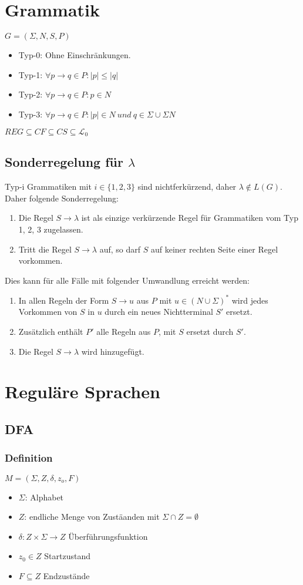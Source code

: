 \documentclass[9pt]{article}
\begin{document}
\section{Grammatik}
$G = (\Sigma, N, S, P)$
\begin{itemize}
	\item Typ-0: Ohne Einschränkungen.
	\item Typ-1: $\forall p \rightarrow q \in P : |p| \leq |q|$ 
	\item Typ-2: $\forall p \rightarrow q \in P : p \in N$ 
	\item Typ-3: $\forall p \rightarrow q \in P : |p| \in N \ und\ q \in \Sigma \cup \Sigma N$ 
\end{itemize}
$REG \subseteq CF \subseteq CS \subseteq \mathcal{L}_0$
\subsection{Sonderregelung für $\lambda$}
Typ-i Grammatiken mit $i\in \{1, 2, 3\}$ sind nichtferkürzend, daher $\lambda \notin L(G)$. Daher folgende Sonderregelung:
\begin{enumerate}
	\item Die Regel $S \rightarrow \lambda$ ist als einzige verkürzende Regel für Grammatiken vom Typ 1, 2, 3 zugelassen.
	\item Tritt die Regel $S \rightarrow \lambda$ auf, so darf $S$ auf keiner rechten Seite einer Regel vorkommen.
\end{enumerate}
Dies kann für alle Fälle mit folgender Umwandlung erreicht werden:
\begin{enumerate}
	\item In allen Regeln der Form $S \rightarrow u$ aus $P$ mit $u \in (N \cup \Sigma)^*$ wird jedes Vorkommen von $S$ in $u$ durch ein neues Nichtterminal $S'$ ersetzt.
	\item Zusätzlich enthält $P'$ alle Regeln aus $P$, mit $S$ ersetzt durch $S'$.
	\item Die Regel $S \rightarrow \lambda$ wird hinzugefügt.
\end{enumerate}
\section{Reguläre Sprachen}
\subsection{DFA}
\subsubsection{Definition}
$M=(\Sigma, Z, \delta, z_o, F)$
\begin{itemize}
	\item $\Sigma$: Alphabet
	\item $Z$: endliche Menge von Zustäanden mit $\Sigma \cap Z = \emptyset$
	\item $\delta: Z \times \Sigma \rightarrow Z$ Überführungsfunktion
	\item $z_0 \in Z$ Startzustand
	\item $F \subseteq Z$ Endzustände
\end{itemize}
\end{document}
